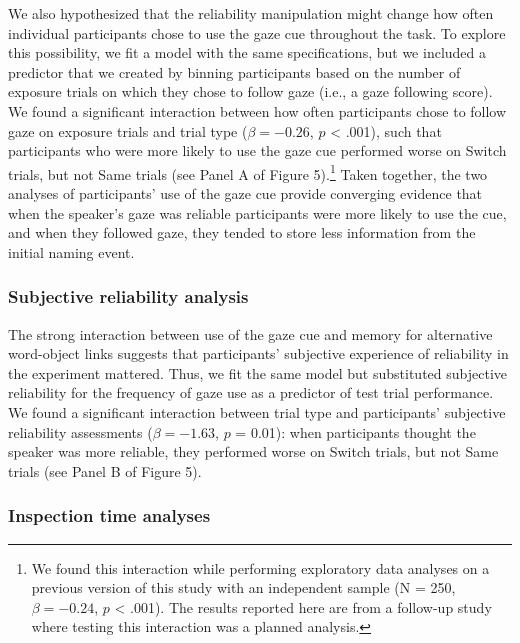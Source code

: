 \documentclass[oneside]{report}
\begin{document}
We also hypothesized that the reliability manipulation might change how
often individual participants chose to use the gaze cue throughout the
task. To explore this possibility, we fit a model with the same
specifications, but we included a predictor that we created by binning
participants based on the number of exposure trials on which they chose
to follow gaze (i.e., a gaze following score). We found a significant
interaction between how often participants chose to follow gaze on
exposure trials and trial type (\(\beta = -0.26\), \(p\) \textless{}
.001), such that participants who were more likely to use the gaze cue
performed worse on Switch trials, but not Same trials (see Panel A of
Figure 5).\footnote{We found this interaction while performing
  exploratory data analyses on a previous version of this study with an
  independent sample (N = 250, \(\beta = -0.24\), \(p\) \textless{}
  .001). The results reported here are from a follow-up study where
  testing this interaction was a planned analysis.} Taken together, the
two analyses of participants' use of the gaze cue provide converging
evidence that when the speaker's gaze was reliable participants were
more likely to use the cue, and when they followed gaze, they tended to
store less information from the initial naming event.

\hypertarget{subjective-reliability-analysis}{%
\subsubsection{Subjective reliability
analysis}\label{subjective-reliability-analysis}}

The strong interaction between use of the gaze cue and memory for
alternative word-object links suggests that participants' subjective
experience of reliability in the experiment mattered. Thus, we fit the
same model but substituted subjective reliability for the frequency of
gaze use as a predictor of test trial performance. We found a
significant interaction between trial type and participants' subjective
reliability assessments (\(\beta = -1.63\), \(p\) = 0.01): when
participants thought the speaker was more reliable, they performed worse
on Switch trials, but not Same trials (see Panel B of Figure 5).

\hypertarget{inspection-time-analyses}{%
\subsubsection{Inspection time
analyses}\label{inspection-time-analyses}}
\end{document}
